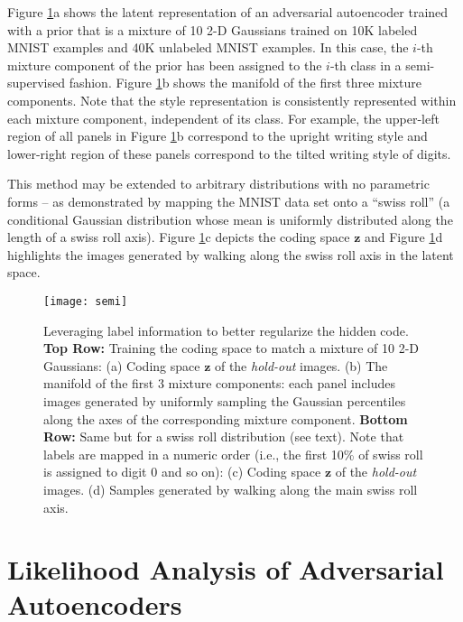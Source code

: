 \documentclass{article}
\begin{document}
Figure \ref{fig_semi_regularization}a shows the latent representation of an adversarial autoencoder trained with a prior that is a mixture of 10 2-D Gaussians trained on 10K labeled MNIST examples and 40K unlabeled MNIST examples.
In this case, the $i$-th mixture component of the prior has been assigned to the $i$-th class in a semi-supervised fashion.
Figure \ref{fig_semi_regularization}b shows the manifold of the first three mixture components.
Note that the style representation is consistently represented within each mixture component, independent of its class.
For example, the upper-left region of all panels in Figure \ref{fig_semi_regularization}b correspond to the upright writing style and lower-right region of these panels correspond to the tilted writing style of digits.

This method may be extended to arbitrary distributions with no parametric forms -- as demonstrated by mapping the MNIST data set onto a ``swiss roll'' (a conditional Gaussian distribution whose mean is uniformly distributed along the length of a swiss roll axis).
Figure \ref{fig_semi_regularization}c depicts the coding space $\mathbf{z}$ and Figure \ref{fig_semi_regularization}d highlights the images generated by walking along the swiss roll axis in the latent space.


\begin{figure}[t]
\centering\texttt{[image: semi]}
\caption{\label{fig_semi_regularization}Leveraging label information to better regularize the hidden code. \textbf{Top Row:} Training the coding space to match a mixture of 10 2-D Gaussians: (a) Coding space $\mathbf{z}$ of the \emph{hold-out} images. (b) The manifold of the first 3 mixture components: each panel includes images generated by uniformly sampling the Gaussian percentiles along the axes of the corresponding mixture component. \textbf{Bottom Row:} Same but for a swiss roll distribution (see text). Note that labels are mapped in a numeric order (i.e., the first 10\% of swiss roll is assigned to digit $0$ and so on): (c) Coding space $\mathbf{z}$ of the \emph{hold-out} images. (d) Samples generated by walking along the main swiss roll axis.}
\end{figure}


\vspace{.2cm}
\section{Likelihood Analysis of Adversarial Autoencoders}\label{experiments}
\vspace{-.3cm}
\end{document}
